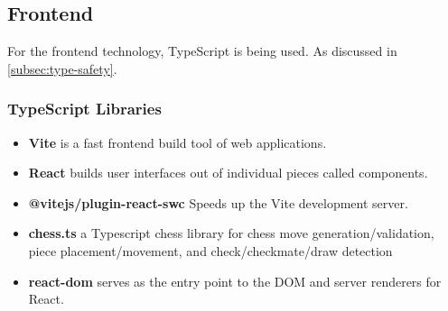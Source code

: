 \subsection{Frontend}

For the frontend technology, TypeScript is being used. As discussed in \ref{subsec:type-safety}.

\subsubsection*{TypeScript Libraries}

\begin{itemize}
    \item \textbf{Vite} is a fast frontend build tool of web applications. \cite{ts:vite}
    
    \item \textbf{React} builds user interfaces out of individual pieces called components. \cite{ts:react}
    
    \item \textbf{@vitejs/plugin-react-swc} Speeds up the Vite development server. \cite{ts:swc}
    
    \item \textbf{chess.ts} a Typescript chess library for chess move generation/validation, piece placement/movement, and check/checkmate/draw detection \cite{ts:chess}
    
    \item \textbf{react-dom} serves as the entry point to the DOM and server renderers for React. \cite{ts:react-dom}
\end{itemize}